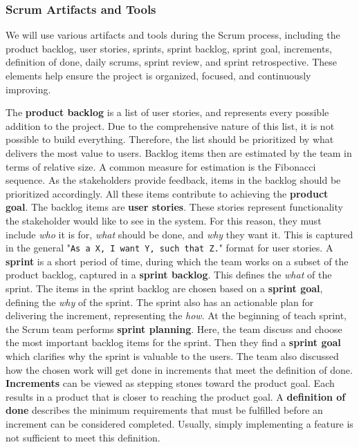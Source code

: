 \subsubsection*{Scrum Artifacts and Tools}
We will use various artifacts and tools during the Scrum process, including the product backlog, user stories, sprints, sprint backlog, sprint goal, increments, definition of done, daily scrums, sprint review, and sprint retrospective.
These elements help ensure the project is organized, focused, and continuously improving.

The \textbf{product backlog} is a list of user stories, and represents every possible addition to the project.
Due to the comprehensive nature of this list, it is not possible to build everything.
Therefore, the list should be prioritized by what delivers the most value to users.
Backlog items then are estimated by the team in terms of relative size.
A common measure for estimation is the Fibonacci sequence.
As the stakeholders provide feedback, items in the backlog should be prioritized accordingly.
All these items contribute to achieving the \textbf{product goal}.
The backlog items are \textbf{user stories}.
These stories represent functionality the stakeholder would like to see in the system.
For this reason, they must include \textit{who} it is for, \textit{what} should be done, and \textit{why} they want it.
This is captured in the general "\texttt{As a X, I want Y, such that Z.}" format for user stories.
A \textbf{sprint} is a short period of time, during which the team works on a subset of the product backlog, captured in a \textbf{sprint backlog}.
This defines the \textit{what} of the sprint.
The items in the sprint backlog are chosen based on a \textbf{sprint goal}, defining the \textit{why} of the sprint.
The sprint also has an actionable plan for delivering the increment, representing the \textit{how}.
At the beginning of teach sprint, the Scrum team performs \textbf{sprint planning}.
Here, the team discuss and choose the most important backlog items for the sprint.
Then they find a \textbf{sprint goal} which clarifies why the sprint is valuable to the users.
The team also discussed how the chosen work will get done in increments that meet the definition of done.
\textbf{Increments} can be viewed as stepping stones toward the product goal.
Each results in a product that is closer to reaching the product goal.
A \textbf{definition of done} describes the minimum requirements that must be fulfilled before an increment can be considered completed.
Usually, simply implementing a feature is not sufficient to meet this definition.
